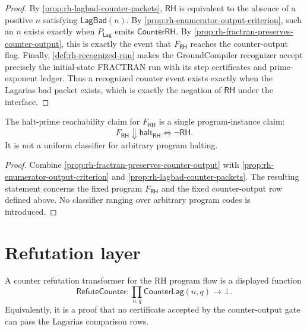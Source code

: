 \begin{proof}
By \autoref{prop:rh-lagbad-counter-packets}, $\mathsf{RH}$ is equivalent to
the absence of a positive $n$ satisfying $\mathsf{LagBad}(n)$.  By
\autoref{prop:rh-enumerator-output-criterion}, such an $n$ exists exactly
when $P_{\mathsf{Lag}}$ emits $\mathsf{CounterRH}$.  By
\autoref{prop:rh-fractran-preserves-counter-output}, this is exactly the
event that $F_{\mathsf{RH}}$ reaches the counter-output flag.  Finally,
\autoref{def:rh-recognized-run} makes the GroundCompiler recognizer accept
precisely the initial-state FRACTRAN run with its step certificates and
prime-exponent ledger.  Thus a recognized counter event exists exactly when
the Lagarias bad packet exists, which is exactly the negation of
$\mathsf{RH}$ under the interface.
\end{proof}

\begin{corollary}
\label{cor:rh-specific-halting-instance}
The halt-prime reachability claim for $F_{\mathsf{RH}}$ is a single
program-instance claim:
$$
F_{\mathsf{RH}}\Downarrow\mathsf{halt}_{\mathsf{RH}}
\Longleftrightarrow
\neg\mathsf{RH}.
$$
It is not a uniform classifier for arbitrary program halting.
\end{corollary}

\begin{proof}
Combine \autoref{prop:rh-fractran-preserves-counter-output} with
\autoref{prop:rh-enumerator-output-criterion} and
\autoref{prop:rh-lagbad-counter-packets}.  The resulting statement concerns
the fixed program $F_{\mathsf{RH}}$ and the fixed counter-output row defined
above.  No classifier ranging over arbitrary program codes is introduced.
\end{proof}

\section{Refutation layer}
\label{sec:rh-counterprogram-refutation-layer}

\begin{definition}
\label{def:rh-counter-refutation-transformer}
A counter refutation transformer for the RH program flow is a displayed
function
$$
\mathsf{RefuteCounter}
:
\prod_{n,q}\mathsf{CounterLag}(n,q)\to\bot.
$$
Equivalently, it is a proof that no certificate accepted by the
counter-output gate can pass the Lagarias comparison rows.
\end{definition}

